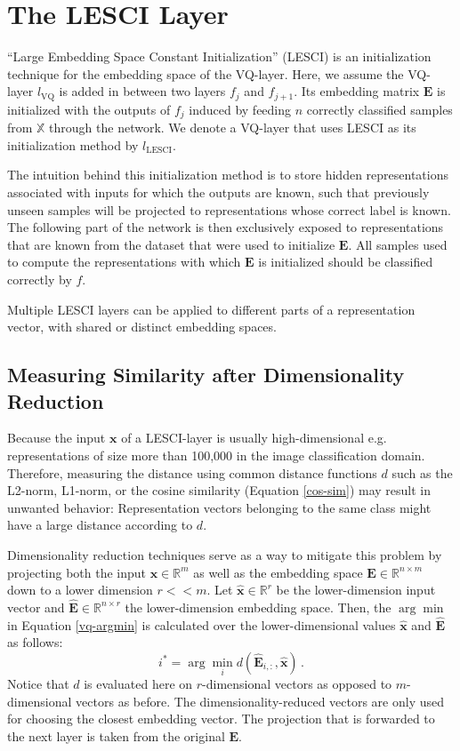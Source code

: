 \documentclass{article}
\begin{document}
\section{The LESCI Layer}

\enquote{Large Embedding Space Constant Initialization} (LESCI) is an initialization technique for the embedding space of the VQ-layer.
Here, we assume the VQ-layer $l_{\text{VQ}}$ is added in between two layers $f_j$ and $f_{j+1}$.
Its embedding matrix $\bm{E}$ is initialized with the outputs of $f_j$ induced by feeding $n$ correctly classified samples from $\mathbb{X}$ through the network.
We denote a VQ-layer that uses LESCI as its initialization method by $l_\text{LESCI}$.

The intuition behind this initialization method is to store hidden representations associated with inputs for which the outputs are known, such that previously unseen samples will be projected to representations whose correct label is known.
The following part of the network is then exclusively exposed to representations that are known from the dataset that were used to initialize $\bm{E}$.
All samples used to compute the representations with which $\bm{E}$ is initialized should be classified correctly by $f$.

Multiple LESCI layers can be applied to different parts of a representation vector, with shared or distinct embedding spaces.

\subsection{Measuring Similarity after Dimensionality Reduction}
Because the input $\bm{x}$ of a LESCI-layer is usually high-dimensional e.g. representations of size more than 100,000 in the image classification domain.
Therefore, measuring the distance using common distance functions $d$ such as the L2-norm, L1-norm, or the cosine similarity (Equation \ref{cos-sim}) may result in unwanted behavior:
Representation vectors belonging to the same class might have a large distance according to $d$.

Dimensionality reduction techniques serve as a way to mitigate this problem by projecting both the input $\bm{x} \in \mathbb{R}^m$ as well as the embedding space $\bm{E} \in \mathbb{R}^{n \times m}$ down to a lower dimension $r << m$.
Let $\bm{\hat{x}} \in \mathbb{R}^r$ be the lower-dimension input vector and $\bm{\hat{E}} \in \mathbb{R}^{n \times r}$ the lower-dimension embedding space. Then, the $\arg\min$ in Equation \ref{vq-argmin} is calculated over the lower-dimensional values $\bm{\hat{x}}$ and $\bm{\hat{E}}$ as follows:
\begin{equation}
    i^*=\arg\min_i d\left(\bm{\hat{E}}_{i,:},\bm{\hat{x}}\right)\,.
\end{equation}
Notice that $d$ is evaluated here on $r$-dimensional vectors as opposed to $m$-dimensional vectors as before.
The dimensionality-reduced vectors are only used for choosing the closest embedding vector.
The projection that is forwarded to the next layer is taken from the original $\bm{E}$.
\end{document}
